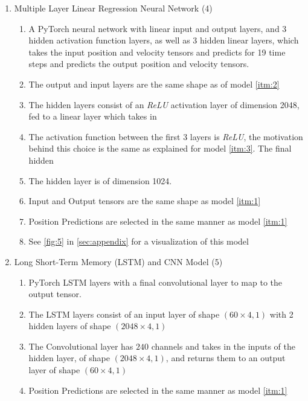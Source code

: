 \documentclass{article}
\begin{document}
\begin{enumerate}
        \item Multiple Layer Linear Regression Neural Network (4) 
        \label{itm:4}
        \begin{enumerate}
          \item A PyTorch neural network with linear input and output layers, and 3 hidden activation function layers, as well 
                as 3 hidden linear layers, which takes the input position and velocity tensors and predicts
                for 19 time steps and predicts the output position and velocity tensors.
          \item The output and input layers are the same shape as of model \ref{itm:2}
          \item The hidden layers consist of an \emph{ReLU} activation layer of dimension 2048, fed to a linear layer which takes in  
          \item The activation function between the first 3 layers is \emph{ReLU}, the motivation behind this choice is the same as explained 
                for model \ref{itm:3}. The final hidden
          \item The hidden layer is of dimension 1024.
          \item Input and Output tensors are the same shape as model \ref{itm:1}
          \item Position Predictions are selected in the same manner as model \ref{itm:1}
          \item See \autoref{fig:5} in \autoref{sec:appendix} for a visualization of this model 
        \end{enumerate}
        \item Long Short-Term Memory (LSTM) and CNN Model (5) 
        \label{itm:5}
        \begin{enumerate}
          \item PyTorch LSTM layers with a final convolutional layer to map to the output tensor.
          \item The LSTM layers consist of an input layer of shape $\left( 60 \times 4, 1 \right)$ with 2 hidden layers of shape 
                $\left( 2048 \times 4, 1 \right)$
          \item The Convolutional layer has $240$ channels and takes in the inputs of the hidden layer,
                of shape $\left( 2048 \times 4, 1 \right)$, and returns them to an output layer of shape $\left( 60 \times 4, 1 \right)$
          \item Position Predictions are selected in the same manner as model \ref{itm:1}
        \end{enumerate}
      \end{enumerate}
\end{document}
